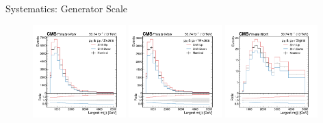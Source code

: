 \begin{frame}[fragile]{Systematics: Generator Scale}
  	\begin{figure}[htpb]
  	  \centering
  	  \includegraphics[width=0.32\textwidth]{fig/syst/Syst-LHEWeight_Scale/Syst-LHEWeight_Scale_2018_ZJets.pdf}
  	  \includegraphics[width=0.32\textwidth]{fig/syst/Syst-LHEWeight_Scale/Syst-LHEWeight_Scale_2018_wJets.pdf}
  	  \includegraphics[width=0.32\textwidth]{fig/syst/Syst-LHEWeight_Scale/Syst-LHEWeight_Scale_2018_wz_300_5.pdf}
  	\end{figure}
\end{frame}
